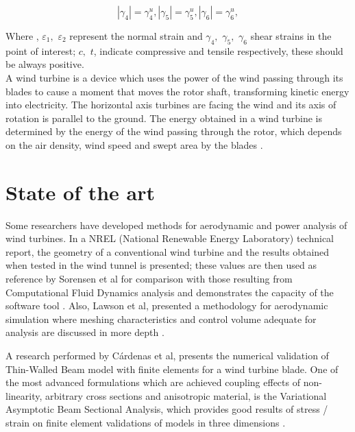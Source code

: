 \begin{equation}
|\gamma_4|=\gamma_4^u,|\gamma_5|=\gamma_5^u,|\gamma_6|=\gamma_6^u,
\end{equation}

Where , $\varepsilon_1,$ $\varepsilon_2$ represent the normal strain and $\gamma_4,$ $\gamma_5,$ $\gamma_6$ shear strains in the point of interest; $c,$ $t$, indicate compressive and tensile respectively,  these should be always positive.\\

A wind turbine is a device which uses the power of the wind passing through its blades to cause a moment that moves the rotor shaft, transforming kinetic energy into electricity. The horizontal axis turbines are facing the wind and its axis of rotation is parallel to the ground. The energy obtained in a wind turbine is determined by the energy of the wind passing through the rotor, which depends on the air density, wind speed and swept area by the blades \cite{calvo}.


\vspace{-0.5cm}
\section{State of the art}
\label{sec:2}
Some researchers have developed methods for aerodynamic and power analysis of wind turbines. In a NREL (National Renewable Energy Laboratory) technical report, the geometry of a conventional wind turbine and the results obtained when tested in the wind tunnel \cite{nrel} is presented; these values are then used as reference by Sorensen et al for comparison with those resulting from Computational Fluid Dynamics analysis and demonstrates the capacity of the software tool \cite{sor}. Also, Lawson et al, presented a methodology for aerodynamic simulation where meshing characteristics and control volume adequate for analysis are discussed in more depth \cite{lawson}.


A research performed by C\'{a}rdenas et al, presents the numerical validation of Thin-Walled Beam model with finite elements for a wind turbine blade. One of the most advanced formulations which are achieved coupling effects of non-linearity, arbitrary cross sections and anisotropic material, is the Variational Asymptotic Beam Sectional Analysis, which provides good results of stress / strain on finite element validations of models in three dimensions \cite{cardenas}.

